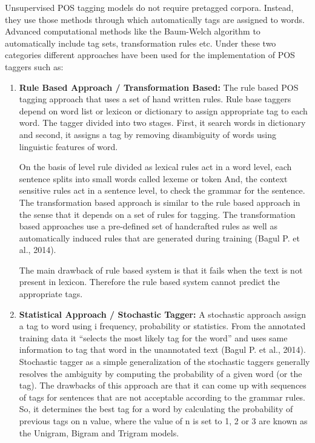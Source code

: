\documentclass[12pt,a4paper,oneside]{memoir}
\begin{document}
Unsupervised POS tagging models do not require pretagged corpora. Instead, they use those methods through which automatically tags are assigned to words. Advanced computational methods like the Baum-Welch algorithm to automatically include tag sets, transformation rules etc. Under these two categories different approaches have been used for the implementation of POS taggers such as: 

\begin{enumerate}
  \item \textbf{Rule Based Approach / Transformation Based:} The rule based POS tagging approach that uses a set of hand written rules. Rule base taggers depend on word list or lexicon or dictionary to assign appropriate tag to each word. The tagger divided into two stages. First, it search words in dictionary and second, it assigns a tag by removing disambiguity of words using linguistic features of word.	

On the basis of level rule divided as lexical rules act in a word level, each sentence splits into small words called lexeme or token And, the context sensitive rules act in a sentence level, to check the grammar for the sentence. The transformation based approach is similar to the rule based approach in the sense that it depends on a set of rules for tagging. The transformation based approaches use a pre-defined set of handcrafted rules as well as automatically induced rules that are generated during training (Bagul P. et al., 2014). 

The main drawback of rule based system is that it fails when the text is not present in lexicon. Therefore the rule based system cannot predict the appropriate tags. 

  \item \textbf{Statistical Approach / Stochastic Tagger:} A stochastic approach assign a tag to word using i frequency, probability or statistics. From the annotated training data it “selects the most likely tag for the word” and uses same information to tag that word in the unannotated text (Bagul P. et al., 2014). Stochastic tagger as a simple generalization of the stochastic taggers generally resolves the ambiguity by computing the probability of a given word (or the tag).
The drawbacks of this approach are that it can come up with sequences of tags for sentences that are not acceptable according to the grammar rules. So, it determines the best tag for a word by calculating the probability of previous tags on n value, where the value of n is set to 1, 2 or 3 are known as the Unigram, Bigram and Trigram models.
 


\end{enumerate}
\end{document}
